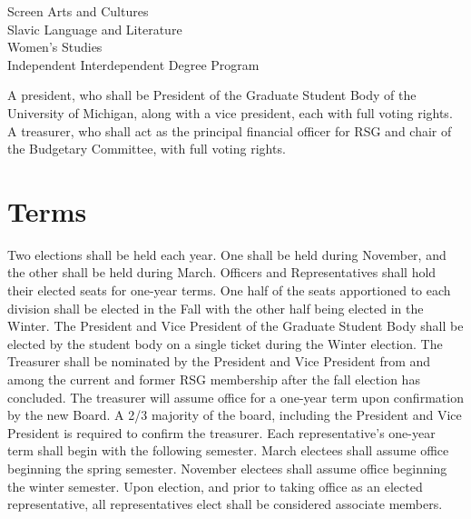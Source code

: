 \begin{enumsubsection}
\begin{enumsubsubsection}
\begin{description}
Screen Arts and Cultures\\
Slavic Language and Literature\\
Women's Studies\\
Independent Interdependent Degree Program\\
\end{description}
\end{enumsubsubsection}
\itemnotoc A president, who shall be President of the Graduate Student Body of the 
University of Michigan, along with a vice president, each with full voting 
rights. 
\itemnotoc A treasurer, who shall act as the principal financial officer for RSG and chair 
of the Budgetary Committee, with full voting rights. 
\end{enumsubsection}

\section{Terms}
\begin{enumsubsection}
\itemnotoc Two elections shall be held each year. One shall be held during November, and the other shall be held during March. Officers and Representatives shall 
hold their elected seats for one-year terms. One half of the seats apportioned 
to each division shall be elected in the Fall with the other half being elected in 
the Winter. 
\itemnotoc The President and Vice President of the Graduate Student Body shall be 
elected by the student body on a single ticket during the Winter election. 
\itemnotoc The Treasurer shall be nominated by the President and Vice President 
from and among the current and former RSG membership after the fall 
election has concluded. The treasurer will assume office for a one-year term 
upon confirmation by the new Board. A 2/3 majority of the board, including 
the President and Vice President is required to confirm the treasurer. 
\itemnotoc Each representative's one-year term shall begin with the following 
semester. March electees shall assume office beginning the spring semester. 
November electees shall assume office beginning the winter semester. Upon 
election, and prior to taking office as an elected representative, all 
representatives elect shall be considered associate members. 
\end{enumsubsection}

